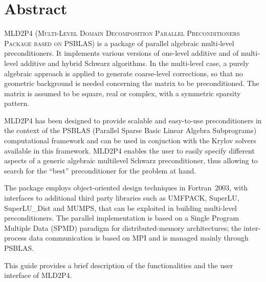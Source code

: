 \section*{Abstract}
\textsc{MLD2P4 (Multi-Level Domain Decomposition Parallel Preconditioners Package based on
PSBLAS}) is a package of parallel algebraic multi-level preconditioners.
It implements various versions of one-level additive and of multi-level additive
and hybrid Schwarz algorithms. In the multi-level case, a purely algebraic approach
is applied to generate coarse-level corrections, so that no geometric background is needed
concerning the matrix to be preconditioned. The matrix is assumed to be square, real
or complex, with a symmetric sparsity pattern. 

MLD2P4 has been designed to provide scalable and easy-to-use preconditioners in the
context of the PSBLAS (Parallel Sparse Basic Linear Algebra Subprograms)
computational framework and can be used in conjuction with the Krylov solvers
available in this framework. MLD2P4 enables the user to easily specify different aspects
of a generic algebraic multilevel Schwarz preconditioner, thus allowing to search
for the ``best'' preconditioner for the problem at hand. 

The package employs object-oriented design techniques in
Fortran~2003, with interfaces to additional third party libraries 
such as UMFPACK, SuperLU, SuperLU\_Dist and MUMPS, that
can be exploited in building multi-level preconditioners. The parallel
implementation is based on a Single Program Multiple Data (SPMD)
paradigm for distributed-memory architectures; the inter-process data
communication is based on MPI and is managed mainly through PSBLAS.

This guide provides a brief description of the functionalities and
the user interface of MLD2P4.
